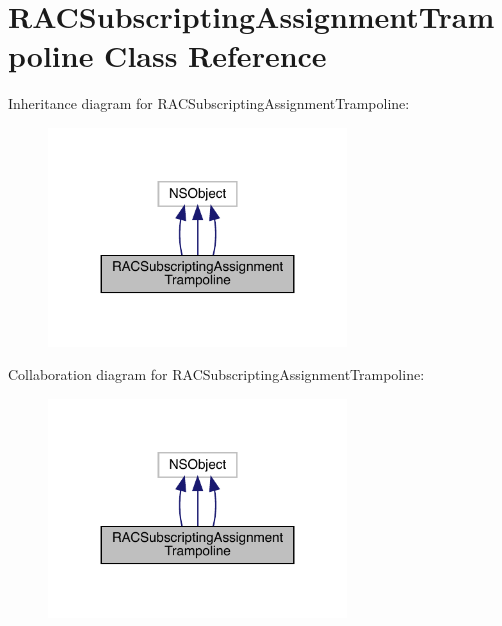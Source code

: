 \hypertarget{interface_r_a_c_subscripting_assignment_trampoline}{}\section{R\+A\+C\+Subscripting\+Assignment\+Trampoline Class Reference}
\label{interface_r_a_c_subscripting_assignment_trampoline}


Inheritance diagram for R\+A\+C\+Subscripting\+Assignment\+Trampoline\+:\nopagebreak
\begin{figure}[H]
\begin{center}
\leavevmode
\includegraphics[width=224pt]{interface_r_a_c_subscripting_assignment_trampoline__inherit__graph}
\end{center}
\end{figure}


Collaboration diagram for R\+A\+C\+Subscripting\+Assignment\+Trampoline\+:\nopagebreak
\begin{figure}[H]
\begin{center}
\leavevmode
\includegraphics[width=224pt]{interface_r_a_c_subscripting_assignment_trampoline__coll__graph}
\end{center}
\end{figure}
